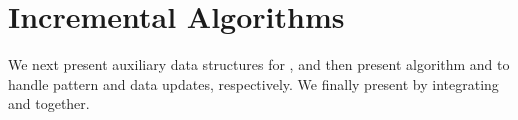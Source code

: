 \section{Incremental Algorithms}
\label{sec-IncAlg}

We next present auxiliary data structures for \inc,
and then present algorithm \incp and \incd to handle pattern and data updates, respectively.
We finally present \inc by integrating \incp and \incd together.






